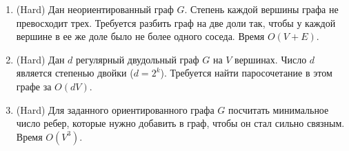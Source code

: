 \begin{enumerate}
  \item (Hard) Дан неориентированный граф $G$. Степень каждой вершины
      графа не превосходит трех. Требуется разбить граф на две доли так,
      чтобы у каждой вершине в ее же доле было не более одного соседа.
      Время $O(V + E)$.

  \item (Hard) Дан $d$ регулярный двудольный граф $G$ на $V$ вершинах. 
      Число $d$ является степенью двойки ($d = 2^k$). Требуется
      найти паросочетание в этом графе за $O(dV)$.

  \item (Hard) Для заданного ориентированного графа $G$ посчитать
        минимальное число ребер, которые нужно добавить в граф, чтобы
        он стал сильно связным. Время $O(V^3)$.

\end{enumerate}
